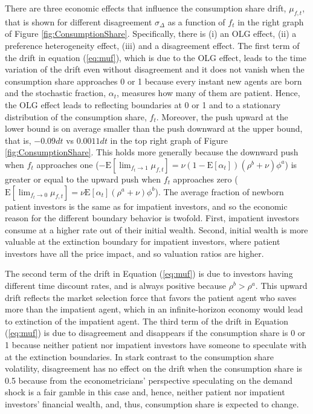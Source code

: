\documentclass[preprint,11pt,authoryear]{elsarticle}
\theoremstyle{plain}
\begin{document}
There are three economic effects that influence the consumption share drift, $\mu_{f,t}$, that is shown for different disagreement $\sigma_{\Delta}$ as a function of $f_t$ in the right graph of Figure \ref{fig:ConsumptionShare}. Specifically, there is (i) an OLG effect, (ii) a preference heterogeneity effect, (iii) and a disagreement effect. The first term of the drift in equation (\ref{eq:muf}), which is due to the OLG effect, leads to the time variation of the drift even without disagreement and it does not vanish when the consumption share approaches 0 or 1
because every instant new agents are born and the stochastic fraction, $\alpha_t$, measures how many of them are patient. Hence, the OLG effect leads to reflecting boundaries at 0 or 1 and to a stationary distribution of the consumption share, $f_t$. Moreover, the push upward at the lower bound is on average smaller than the push downward at the upper bound, that is,  $-0.09 dt$ vs $0.0011 dt$ in the top right graph of Figure \ref{fig:ConsumptionShare}. This holds more generally because the downward push when $f_t$ approaches one ($- \mathrm{E}[ \lim_{f_t \to 1} \mu_{f,t}] =   \nu \left( 1 - \mathrm{E}[\alpha_t ] \right)  (\rho^b+\nu) \phi^a$) is greater or equal to the upward push when $f_t$ approaches zero ($\mathrm{E}[ \lim_{f_t \to 0} \mu_{f,t}] =  \nu \mathrm{E}[\alpha_t ]  (\rho^a+\nu)  \phi^b$).
The average fraction of newborn patient investors is the same as for impatient investors, and so the economic reason for the different boundary behavior is twofold. First, impatient investors consume at a higher rate out of their initial wealth. Second, initial wealth is more valuable at the extinction boundary for impatient investors, where patient investors have all the price impact, and so valuation ratios are higher.  

The second term of the drift in Equation (\ref{eq:muf}) is due to investors having different time discount rates, and is always positive because $\rho^b>\rho^a$. This upward drift reflects the market selection force that favors the patient agent who saves more than the impatient agent, which in an infinite-horizon economy would lead to extinction of the impatient agent.  The third term of the drift in Equation (\ref{eq:muf}) is due to disagreement and disappears if the consumption share is 0 or 1 because neither patient nor impatient investors have someone to speculate with at the extinction boundaries.   In stark contrast to the consumption share volatility, disagreement has no effect on the drift when the consumption share is 0.5 because from the econometricians' perspective speculating on the demand shock is a fair gamble in this case and, hence, neither patient nor impatient investors' financial wealth, and, thus, consumption share is expected to change. 
\end{document}
